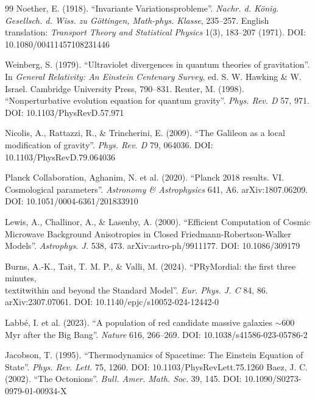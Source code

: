 \documentclass[a4paper,12pt]{article}
\begin{document}
\begin{thebibliography}{99}
 Noether, E. (1918). ``Invariante Variationsprobleme''. \textit{Nachr. d. König. Gesellsch. d. Wiss. zu Göttingen, Math-phys. Klasse}, 235--257. English translation: \textit{Transport Theory and Statistical Physics} 1(3), 183--207 (1971). DOI: 10.1080/00411457108231446


 Weinberg, S. (1979). ``Ultraviolet divergences in quantum theories of gravitation''. In \textit{General Relativity: An Einstein Centenary Survey}, ed. S. W. Hawking \& W. Israel. Cambridge University Press, 790--831.
 Reuter, M. (1998). ``Nonperturbative evolution equation for quantum gravity''. \textit{Phys. Rev. D} 57, 971. DOI: 10.1103/PhysRevD.57.971

 Nicolis, A., Rattazzi, R., \& Trincherini, E. (2009). ``The Galileon as a local modification of gravity''. \textit{Phys. Rev. D} 79, 064036. DOI: 10.1103/PhysRevD.79.064036


 Planck Collaboration, Aghanim, N. et al. (2020). ``Planck 2018 results. VI. Cosmological parameters''. \textit{Astronomy \& Astrophysics} 641, A6. arXiv:1807.06209. DOI: 10.1051/0004-6361/201833910

 Lewis, A., Challinor, A., \& Lasenby, A. (2000). ``Efficient Computation of Cosmic Microwave Background Anisotropies in Closed Friedmann-Robertson-Walker Models''. \textit{Astrophys. J.} 538, 473. arXiv:astro-ph/9911177. DOI: 10.1086/309179

 Burns, A.-K., Tait, T. M. P., \& Valli, M. (2024). ``PRyMordial: the first three minutes, \\textit{within} and beyond the Standard Model''. \textit{Eur. Phys. J. C} 84, 86. arXiv:2307.07061. DOI: 10.1140/epjc/s10052-024-12442-0

 Labb\'{e}, I. et al. (2023). ``A population of red candidate massive galaxies $\sim$600 Myr after the Big Bang''. \textit{Nature} 616, 266--269. DOI: 10.1038/s41586-023-05786-2

 Jacobson, T. (1995). ``Thermodynamics of Spacetime: The Einstein Equation of State''. \textit{Phys. Rev. Lett.} 75, 1260. DOI: 10.1103/PhysRevLett.75.1260
 Baez, J. C. (2002). ``The Octonions''. \textit{Bull. Amer. Math. Soc.} 39, 145. DOI: 10.1090/S0273-0979-01-00934-X


\end{thebibliography}
\end{document}
